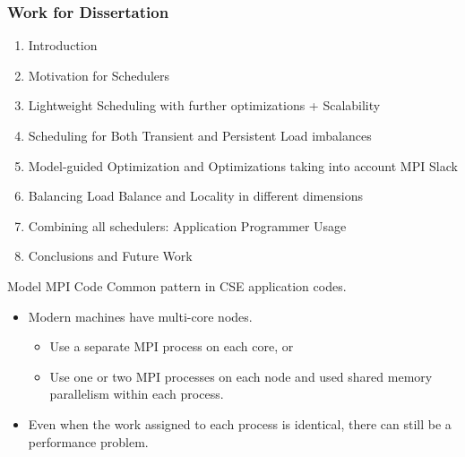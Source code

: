 




\begin{frame}
\frametitle{Work for Dissertation} 

\begin{enumerate}
\item Introduction
\item Motivation for Schedulers
\item Lightweight Scheduling with further optimizations + Scalability  
\item Scheduling for Both Transient and Persistent Load imbalances
\item Model-guided Optimization and Optimizations taking into account MPI Slack
\item Balancing Load Balance and Locality in different dimensions
\item Combining all schedulers: Application Programmer Usage
\item Conclusions and Future Work
\end{enumerate} 
\end{frame} 

\begin{frame}[label=modelMPICode]{Model MPI Code} 
 Common pattern in CSE application codes.\\
  \vspace*{0.1in}

\begin{itemize}
\small \item \small Modern machines have multi-core nodes.
\begin{itemize}
\item \small Use a separate MPI process on each core, or 
\item \small Use one or two MPI processes on each node and used shared
  memory parallelism within each process.
\end{itemize}
\item \small Even when the work assigned to each process is identical, there can still be a performance problem.
\end{itemize} 
\end{frame}

